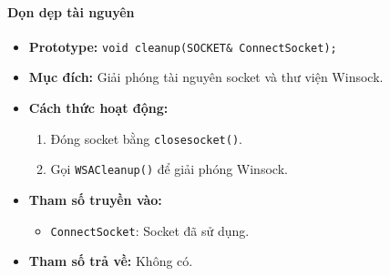 \paragraph{\textbf{Dọn dẹp tài nguyên}}
\begin{itemize}
    \item \textbf{Prototype:} \texttt{void cleanup(SOCKET\& ConnectSocket);}
    
    \item \textbf{Mục đích:} Giải phóng tài nguyên socket và thư viện Winsock.
    
    \item \textbf{Cách thức hoạt động:} 
    \begin{enumerate}
        \item Đóng socket bằng \texttt{closesocket()}.
        \item Gọi \texttt{WSACleanup()} để giải phóng Winsock.
    \end{enumerate}
    
    \item \textbf{Tham số truyền vào:} 
    \begin{itemize}
        \item \texttt{ConnectSocket}: Socket đã sử dụng.
    \end{itemize}
    
    \item \textbf{Tham số trả về:} Không có.
\end{itemize}

